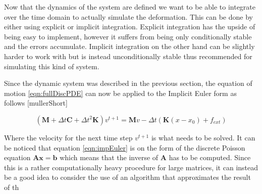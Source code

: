 Now that the dynamics of the system are defined we want to be able to integrate over the time domain to actually simulate the deformation. This can be done by either using explicit or implicit integration. Explicit integration has the upside of being easy to implement, however it suffers from being only conditionally stable and the errors accumulate. Implicit integration on the other hand can be slightly harder to work with but is instead unconditionally stable thus recommended for simulating this kind of system. 

Since the dynamic system was described in the previous section, the equation of motion \ref{eqn:fullDiscPDE} can now be applied to the Implicit Euler form as follows [mullerShort]

\begin{equation}\label{eqn:impEuler}
		(\mathbf{M} + \Delta t  \mathbf{C} + \Delta t^2 \mathbf{K})v^{t+1} = \mathbf{M} v - \Delta t (\mathbf{K}(x - x_0) + f_{ext})
\end{equation}

Where the velocity for the next time step $v^{t+1}$ is what needs to be solved. It can be noticed that equation \ref{eqn:impEuler} is on the form of the discrete Poisson equation $\mathbf{Ax=b}$ which means that the inverse of $\mathbf{A}$ has to be computed. Since this is a rather computationally heavy procedure for large matrices, it can instead be a good idea to consider the use of an algorithm that approximates the result of th